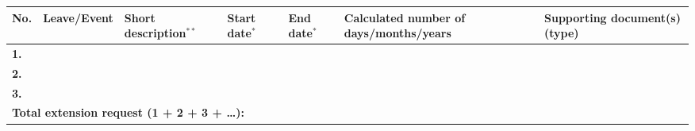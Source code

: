 \documentclass[12pt,a4paper]{article}
\begin{document}
{
\footnotesize
\begin{tabular}{
    |b{}
    |b{}
    |b{}
    |b{}
    |b{}
    |b{}
    |b{}|
} \hline
\textbf{No.} &
\textbf{Leave/Event} &
\textbf{Short description$^{**}$} &
\textbf{Start date$^*$} &
\textbf{End date$^*$} &
\textbf{Calculated number of days/months/years} &
\textbf{Supporting document(s) (type)} \\\hline
\textbf{1.} & & & & & & \\\hline
\textbf{2.} & & & & & & \\\hline
\textbf{3.} & & & & & & \\\hline
\multicolumn{5}{|l|}{\textbf{Total extension request (1 + 2 + 3 + \dots):}} &
\multicolumn{2}{l|}{}
\\\hline
\end{tabular}
\vspace{1cm}
}
\end{document}
